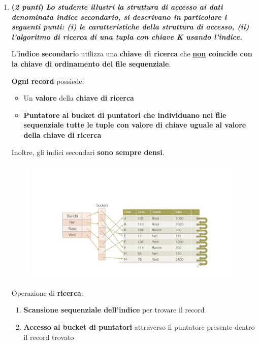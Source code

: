 \documentclass[a4paper]{article}
\begin{document}
\begin{enumerate}
		\item \textbf{(\emph{2 punti})} \textcolor{Green4}{\textbf{\emph{Lo studente illustri la struttura di accesso ai dati denominata indice secondario, si descrivano in particolare i seguenti punti: (i) le caratteristiche della struttura di accesso, (ii) l'algoritmo di ricerca di una tupla con chiave K usando l'indice.}}}\label{dom: indice secondario}
		
		L'\textbf{indice secondari}o utilizza una \textbf{chiave di ricerca} che \textbf{\underline{non} coincide con la chiave di ordinamento del file sequenziale}.
		
		\textbf{Ogni record} possiede:
		\begin{itemize}
			\item Un \textbf{valore} della \textbf{chiave di ricerca}
			
			\item \textbf{Puntatore al bucket di puntatori che individuano nel file sequenziale tutte le tuple con valore di chiave uguale al valore della chiave di ricerca}
		\end{itemize}
		Inoltre, gli indici secondari \textbf{sono sempre densi}.
		
		\begin{figure}[!htp]
			\centering
			\includegraphics[width=\textwidth]{img/ex/indice-secondario-1.pdf}
		\end{figure}
		
		\noindent
		Operazione di \textbf{ricerca}:
		\begin{enumerate}
			\item \textbf{Scansione sequenziale dell'indice} per trovare il record
			
			\item \textbf{Accesso al bucket di puntatori} attraverso il puntatore presente dentro il record trovato
			

\end{enumerate}
\end{enumerate}
\end{document}
